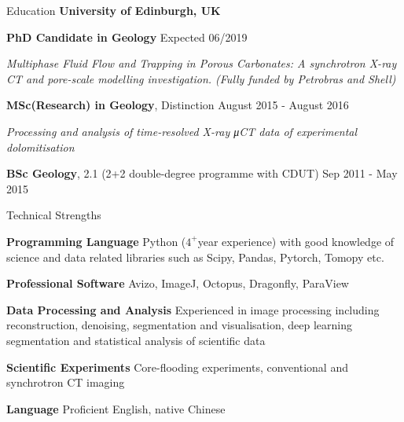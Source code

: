 \documentclass{resume} %
\newenvironment{indentpar}[1]%
  {\begin{list}{}%
          {\setlength{\leftmargin}{#1}}%
          \item[]%
  }
  {\end{list}}
\begin{document}
\begin{rSection}{Education}
{\bf University of Edinburgh, UK} 

\textbf{    PhD Candidate in Geology} \hfill {Expected 06/2019}
\begin{indentpar}{0.5cm}
\textit{Multiphase Fluid Flow and Trapping in Porous Carbonates: A synchrotron X-ray CT and pore-scale modelling investigation. (Fully funded by Petrobras and Shell)}
\end{indentpar}
\textbf{    MSc(Research) in Geology}, Distinction \hfill {August 2015 - August 2016} 
\begin{indentpar}{0.5cm}
\textit {Processing and analysis of time-resolved X-ray μCT data of experimental dolomitisation}
\end{indentpar}
\textbf{    BSc Geology}, 2.1 (2+2 double-degree programme with CDUT) \hfill {Sep 2011 - May 2015} 
\end{rSection}
\begin{rSection}{Technical Strengths}

\begin{indentpar}{0.5cm}
\textbf{Programming Language} Python ($4^+$year experience) with good knowledge of science and data related libraries such as Scipy, Pandas, Pytorch, Tomopy etc. 

\textbf{Professional Software} Avizo, ImageJ, Octopus, Dragonfly, ParaView

\textbf{Data Processing and Analysis}  Experienced in image processing including reconstruction, denoising, segmentation and visualisation, deep learning segmentation and statistical analysis of scientific data

\textbf{Scientific Experiments}  Core-flooding experiments, conventional and synchrotron CT imaging 

\textbf{Language}  Proficient English, native Chinese
\end{indentpar}
\end{rSection}
\end{document}
